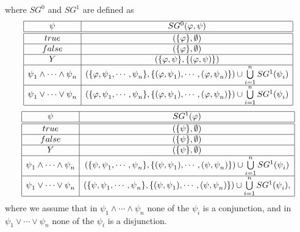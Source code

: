 where $SG^{0}$ and $SG^{1}$ are defined as%
\begin{equation*}
\begin{array}{|c|c|}
\hline
\psi  & SG^{0}(\varphi ,\psi ) \\ \hline\hline
true & (\{\varphi \},\emptyset ) \\ \hline
false & (\{\varphi \},\emptyset ) \\ \hline
Y & (\{\varphi ,\psi \},\{(\varphi ,\psi )\}) \\ \hline
\psi _{1}\wedge \cdots \wedge \psi _{n} & \left( \{\varphi ,\psi _{1},\cdots
,\psi _{n}\},\{(\varphi ,\psi _{1}),\cdots ,(\varphi ,\psi _{n})\}\right)
\cup \bigcup\limits_{i=1}^{n}SG^{1}(\psi _{i}) \\ \hline
\psi _{1}\vee \cdots \vee \psi _{n} & \left( \{\varphi ,\psi _{1},\cdots
,\psi _{n}\},\{(\varphi ,\psi _{1}),\cdots ,(\varphi ,\psi _{n})\}\right)
\cup \bigcup\limits_{i=1}^{n}SG^{1}(\psi _{i}) \\ \hline
\end{array}%
\end{equation*}%
\begin{equation*}
\begin{array}{|c|c|}
\hline
\psi  & SG^{1}(\varphi ) \\ \hline\hline
true & (\{\psi \},\emptyset ) \\ \hline
false & (\{\psi \},\emptyset ) \\ \hline
Y & (\{\psi \},\emptyset ) \\ \hline
\psi _{1}\wedge \cdots \wedge \psi _{n} & \left( \{\psi ,\psi _{1},\cdots
,\psi _{n}\},\{(\psi ,\psi _{1}),\cdots ,(\psi ,\psi _{n})\}\right) \cup
\bigcup\limits_{i=1}^{n}SG^{1}(\psi _{i}) \\ \hline
\psi _{1}\vee \cdots \vee \psi _{n} & \left( \{\psi ,\psi _{1},\cdots ,\psi
_{n}\},\{(\psi ,\psi _{1}),\cdots ,(\psi ,\psi _{n})\}\right) \cup
\bigcup\limits_{i=1}^{n}SG^{1}(\psi _{i}), \\ \hline
\end{array}%
\end{equation*}%
where we assume that in $\psi _{1}\wedge \cdots \wedge \psi _{n}$ none of
the $\psi _{i}$ is a conjunction, and in $\psi _{1}\vee \cdots \vee \psi _{n}
$ none of the $\psi _{i}$ is a disjunction.\newpage 
